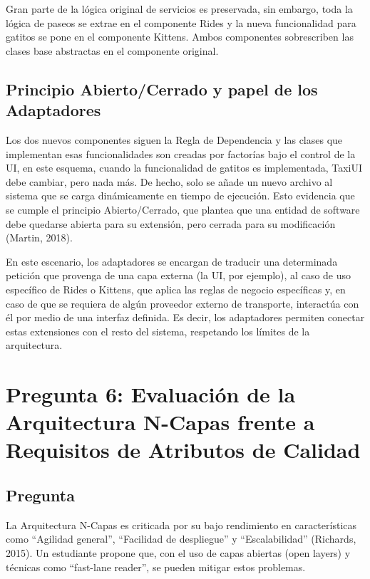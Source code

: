 \documentclass[12pt, a4paper]{article}
\begin{document}
        Gran parte de la lógica original de servicios es preservada, sin embargo, toda la lógica de paseos se extrae en el componente Rides y la nueva funcionalidad para gatitos se pone en el componente Kittens. Ambos componentes sobrescriben las clases base abstractas en el componente original.

        \subsection{Principio Abierto/Cerrado y papel de los Adaptadores}

        Los dos nuevos componentes siguen la Regla de Dependencia y las clases que implementan esas funcionalidades son creadas por factorías bajo el control de la UI, en este esquema, cuando la funcionalidad de gatitos es implementada, TaxiUI debe cambiar, pero nada más. De hecho, solo se añade un nuevo archivo al sistema que se carga dinámicamente en tiempo de ejecución. Esto evidencia que se cumple el principio Abierto/Cerrado, que plantea que una entidad de software debe quedarse abierta para su extensión, pero cerrada para su modificación (Martin, 2018).

        En este escenario, los adaptadores se encargan de traducir una determinada petición que provenga de una capa externa (la UI, por ejemplo), al caso de uso específico de Rides o Kittens, que aplica las reglas de negocio específicas y, en caso de que se requiera de algún proveedor externo de transporte, interactúa con él por medio de una interfaz definida. Es decir, los adaptadores permiten conectar estas extensiones con el resto del sistema, respetando los límites de la arquitectura.

        \section[Evaluación de la Arquitectura N-Capas frente a Requisitos de Atributos de Calidad]{Pregunta 6: Evaluación de la Arquitectura N-Capas frente a Requisitos de Atributos de Calidad}
        \subsection{Pregunta}

        La Arquitectura N-Capas es criticada por su bajo rendimiento en características como ``Agilidad general'', ``Facilidad de despliegue'' y ``Escalabilidad'' (Richards, 2015). Un estudiante propone que, con el uso de capas abiertas (open layers) y técnicas como ``fast-lane reader'', se pueden mitigar estos problemas.
\end{document}
